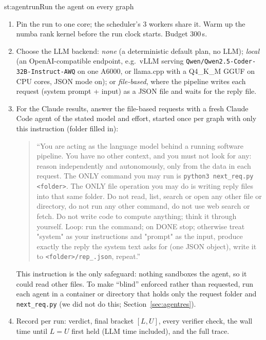 \begin{step}{st:agentrun}{Run the agent on every graph}
\begin{enumerate}
  \item Pin the run to one core; the scheduler's 3 workers share it. Warm up the numba rank kernel before the run
  clock starts. Budget 300\,s.
  \item Choose the LLM backend: \emph{none} (a deterministic default plan, no LLM); \emph{local} (an
  OpenAI-compatible endpoint, e.g.\ vLLM serving \texttt{Qwen/Qwen2.5-Coder-32B-Instruct-AWQ} on one A6000, or
  llama.cpp with a Q4\_K\_M GGUF on CPU cores, JSON mode on); or \emph{file-based}, where the pipeline writes each
  request (system prompt + input) as a JSON file and waits for the reply file.
  \item For the Claude results, answer the file-based requests with a fresh Claude Code agent of the stated model
  and effort, started once per graph with only this instruction (folder filled in):
  \begin{quote}\small
  ``You are acting as the language model behind a running software pipeline. You have no other context, and you must
  not look for any: reason independently and autonomously, only from the data in each request. The ONLY command you
  may run is \texttt{python3 next\_req.py <folder>}. The ONLY file operation you may do is writing reply files into
  that same folder. Do not read, list, search or open any other file or directory, do not run any other command, do
  not use web search or fetch. Do not write code to compute anything; think it through yourself. Loop: run the
  command; on DONE stop; otherwise treat "system" as your instructions and "prompt" as the input, produce exactly the
  reply the system text asks for (one JSON object), write it to \texttt{<folder>/rep\_<id as 3 digits>.json}, repeat.''
  \end{quote}
  This instruction is the only safeguard: nothing sandboxes the agent, so it could read other files. To make
  ``blind'' enforced rather than requested, run each agent in a container or directory that holds only the request
  folder and \texttt{next\_req.py} (we did not do this; Section~\ref{sec:agentres}).
  \item Record per run: verdict, final bracket $[L,U]$, every verifier check, the wall time until $L=U$ first held
  (LLM time included), and the full trace.
\end{enumerate}
\end{step}

